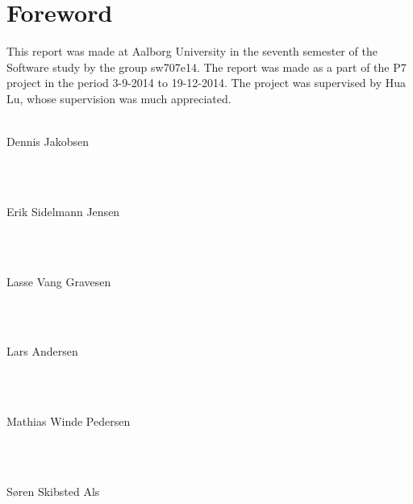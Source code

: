 \thispagestyle{empty}
\section*{Foreword}
\noindent This report was made at Aalborg University in the seventh semester of the Software study by the group sw707e14. The report was made as a part of the P7 project in the period 3-9-2014 to 19-12-2014. The project was supervised by Hua Lu, whose supervision was much appreciated. \\ \\

\noindent
\vspace{5mm}
\parbox[h]{4cm}{Dennis Jakobsen}\hspace{0.5cm} \makebox[7cm]{\hrulefill} \\ \\
\vspace{5mm}
\parbox[h]{4cm}{Erik Sidelmann Jensen}\hspace{0.5cm} \makebox[7cm]{\hrulefill} \\ \\
\vspace{5mm}
\parbox[h]{4cm}{Lasse Vang Gravesen}\hspace{0.5cm} \makebox[7cm]{\hrulefill} \\ \\
\vspace{5mm}
\parbox[h]{4cm}{Lars Andersen}\hspace{0.5cm} \makebox[7cm]{\hrulefill} \\ \\
\vspace{5mm}
\parbox[h]{4cm}{Mathias Winde Pedersen}\hspace{0.5cm} \makebox[7cm]{\hrulefill} \\ \\
\vspace{5mm}
\parbox[h]{4cm}{Søren Skibsted Als}\hspace{0.5cm} \makebox[7cm]{\hrulefill} \\ \\

\newpage